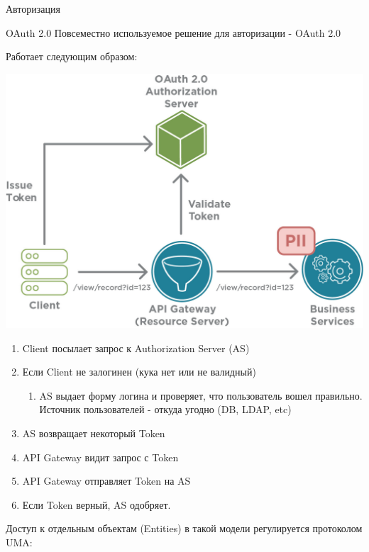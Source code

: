 \documentclass[presentation]{beamer}
\begin{document}
\begin{frame}[label={sec:orga7be39e}]{Авторизация}
\begin{block}{OAuth 2.0}
Повсеместно используемое решение для авторизации - OAuth 2.0

Работает следующим образом:

\begin{center}
\includegraphics[width=.9\linewidth]{./img/oauth2.jpg}
\end{center}


\begin{enumerate}
\item Client посылает запрос к Authorization Server (AS)
\item Если Client не залогинен (кука нет или не валидный)
\begin{enumerate}
\item AS выдает форму логина и проверяет, что пользователь вошел правильно.
Источник пользователей - откуда угодно (DB, LDAP, etc)
\end{enumerate}
\item AS возвращает некоторый Token
\item API Gateway видит запрос с Token
\item API Gateway отправляет Token на AS
\item Если Token верный, AS одобряет.
\end{enumerate}


Доступ к отдельным объектам (Entities) в такой модели регулируется протоколом UMA:


\end{block}
\end{frame}
\end{document}
